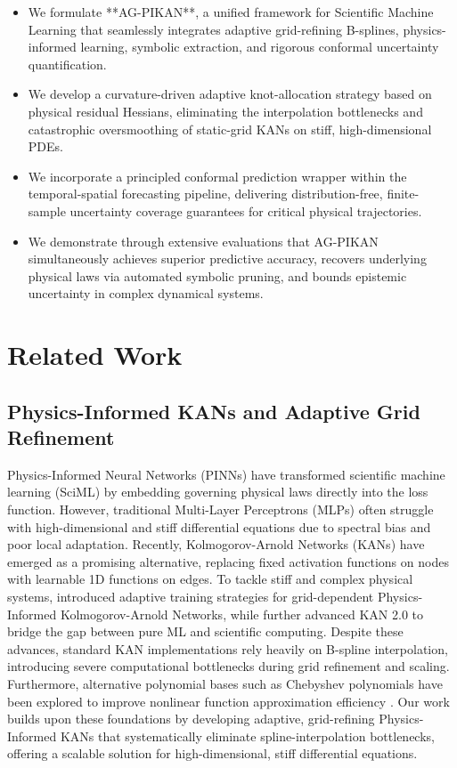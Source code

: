 \documentclass[10pt,twocolumn]{article}
\begin{document}
\begin{itemize}
    \item We formulate **AG-PIKAN**, a unified framework for Scientific Machine Learning that seamlessly integrates adaptive grid-refining B-splines, physics-informed learning, symbolic extraction, and rigorous conformal uncertainty quantification.
    \item We develop a curvature-driven adaptive knot-allocation strategy based on physical residual Hessians, eliminating the interpolation bottlenecks and catastrophic oversmoothing of static-grid KANs on stiff, high-dimensional PDEs.
    \item We incorporate a principled conformal prediction wrapper within the temporal-spatial forecasting pipeline, delivering distribution-free, finite-sample uncertainty coverage guarantees for critical physical trajectories.
    \item We demonstrate through extensive evaluations that AG-PIKAN simultaneously achieves superior predictive accuracy, recovers underlying physical laws via automated symbolic pruning, and bounds epistemic uncertainty in complex dynamical systems.
\end{itemize}

\section{Related Work}
\subsection{Physics-Informed KANs and Adaptive Grid Refinement}
Physics-Informed Neural Networks (PINNs) have transformed scientific machine learning (SciML) by embedding governing physical laws directly into the loss function. However, traditional Multi-Layer Perceptrons (MLPs) often struggle with high-dimensional and stiff differential equations due to spectral bias and poor local adaptation. Recently, Kolmogorov-Arnold Networks (KANs) have emerged as a promising alternative, replacing fixed activation functions on nodes with learnable 1D functions on edges. To tackle stiff and complex physical systems, \cite{ref_3} introduced adaptive training strategies for grid-dependent Physics-Informed Kolmogorov-Arnold Networks, while \cite{target_ref} further advanced KAN 2.0 to bridge the gap between pure ML and scientific computing. Despite these advances, standard KAN implementations rely heavily on B-spline interpolation, introducing severe computational bottlenecks during grid refinement and scaling. Furthermore, alternative polynomial bases such as Chebyshev polynomials have been explored to improve nonlinear function approximation efficiency \cite{ref_5}. Our work builds upon these foundations by developing adaptive, grid-refining Physics-Informed KANs that systematically eliminate spline-interpolation bottlenecks, offering a scalable solution for high-dimensional, stiff differential equations.
\end{document}
